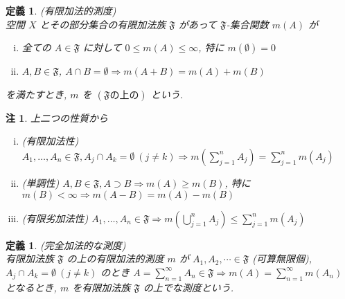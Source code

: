\documentclass[dvipdfmx]{jsreport}
\newtheorem{defi}[theo]{定義}
\newtheorem{rema}[theo]{注}
\begin{document}
\begin{defi} \label{finitely_additive_measure_definition}
    (有限加法的測度) \\
    空間 $X$ とその部分集合の有限加法族 $\mathfrak{F}$ があって $\mathfrak{F}$-集合関数 $m(A)$ が
    \begin{enumerate}[(i)]
        \item 全ての $A \in \mathfrak{F}$ に対して $0 \leq m(A) \leq \infty$, 特に $m(\emptyset) = 0$
        \item $A, B \in \mathfrak{F}$, $A \cap B = \emptyset \Rightarrow m(A + B) = m(A) + m(B)$ 
    \end{enumerate}
    を満たすとき, $m$ を $(\mathfrak{F}の上の)$ という. 
\end{defi}
\begin{rema}
    上二つの性質から
    \begin{enumerate}[(i)]
        \item (有限加法性) $\displaystyle A_1, \dots, A_n \in \mathfrak{F}, A_j \cap A_k = \emptyset \ (j \neq k) \Rightarrow m\left(\sum_{j = 1}^n A_j\right) = \sum_{j = 1}^n m(A_j)$
        \item (単調性) $A, B \in \mathfrak{F}, A \supset B \Rightarrow m(A) \geq m(B)$, 特に $m(B) < \infty \Rightarrow m(A - B) = m(A) - m(B)$
        \item (有限劣加法性) $\displaystyle A_1, \dots, A_n \in \mathfrak{F} \Rightarrow m\left( \bigcup_{j = 1}^n A_j \right) \leq \sum_{j = 1}^n m(A_j)$
    \end{enumerate}
\end{rema}

\begin{defi}
    (完全加法的な測度) \\
    有限加法族 $\mathfrak{F}$ の上の有限加法的測度 $m$ が $A_1, A_2, \cdots \in \mathfrak{F}$ (可算無限個), $A_j \cap A_k = \emptyset \ (j \neq k)$ のとき $\displaystyle A = \sum_{n = 1}^\infty A_n \in \mathfrak{F} \Rightarrow m(A) = \sum_{n = 1}^\infty m(A_n)$ となるとき, 
    $m$ を有限加法族 $\mathfrak{F}$ の上でな測度という. 
\end{defi}
\end{document}
